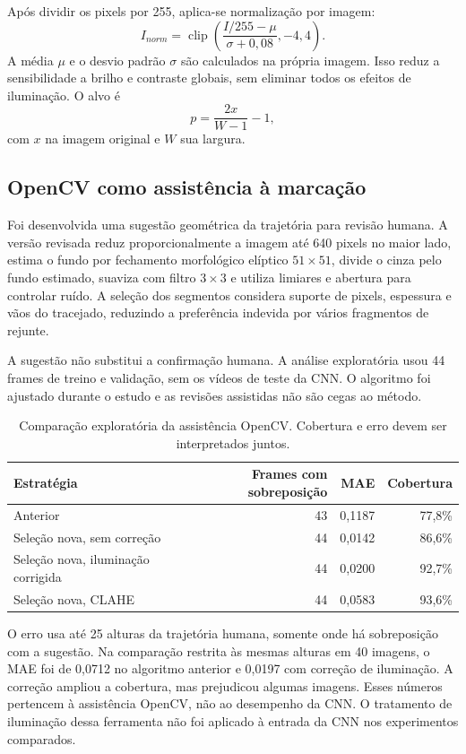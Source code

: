 \documentclass[a4paper,oneside,11pt]{article}
\begin{document}
Após dividir os pixels por 255, aplica-se normalização por imagem:
\begin{equation}
 I_{norm}=\operatorname{clip}\left(\frac{I/255-\mu}{\sigma+0{,}08},-4,4\right).
\end{equation}
A média $\mu$ e o desvio padrão $\sigma$ são calculados na própria imagem. Isso reduz a sensibilidade a brilho e contraste globais, sem eliminar todos os efeitos de iluminação. O alvo é
\begin{equation}
 p=\frac{2x}{W-1}-1,
\end{equation}
com $x$ na imagem original e $W$ sua largura.

\subsection{OpenCV como assistência à marcação}
Foi desenvolvida uma sugestão geométrica da trajetória para revisão humana. A versão revisada reduz proporcionalmente a imagem até 640 pixels no maior lado, estima o fundo por fechamento morfológico elíptico $51\times51$, divide o cinza pelo fundo estimado, suaviza com filtro $3\times3$ e utiliza limiares e abertura para controlar ruído. A seleção dos segmentos considera suporte de pixels, espessura e vãos do tracejado, reduzindo a preferência indevida por vários fragmentos de rejunte.

A sugestão não substitui a confirmação humana. A análise exploratória usou 44 frames de treino e validação, sem os vídeos de teste da CNN. O algoritmo foi ajustado durante o estudo e as revisões assistidas não são cegas ao método.
\begin{table}[ht]\centering\small
\caption{Comparação exploratória da assistência OpenCV. Cobertura e erro devem ser interpretados juntos.}
\begin{tabular}{lrrr}\toprule
Estratégia & Frames com sobreposição & MAE & Cobertura\\\midrule
Anterior &43&0,1187&77,8\%\\
Seleção nova, sem correção &44&0,0142&86,6\%\\
Seleção nova, iluminação corrigida &44&0,0200&92,7\%\\
Seleção nova, CLAHE &44&0,0583&93,6\%\\\bottomrule
\end{tabular}\end{table}
O erro usa até 25 alturas da trajetória humana, somente onde há sobreposição com a sugestão. Na comparação restrita às mesmas alturas em 40 imagens, o MAE foi de 0,0712 no algoritmo anterior e 0,0197 com correção de iluminação. A correção ampliou a cobertura, mas prejudicou algumas imagens. Esses números pertencem à assistência OpenCV, não ao desempenho da CNN. O tratamento de iluminação dessa ferramenta não foi aplicado à entrada da CNN nos experimentos comparados.
\end{document}
